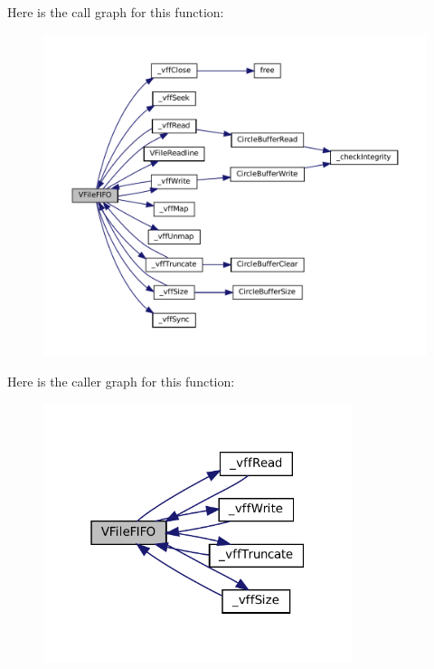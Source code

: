 Here is the call graph for this function\+:
\nopagebreak
\begin{figure}[H]
\begin{center}
\leavevmode
\includegraphics[width=350pt]{vfs-fifo_8c_af4228c6570572950e85b27b5315eec75_cgraph}
\end{center}
\end{figure}
Here is the caller graph for this function\+:
\nopagebreak
\begin{figure}[H]
\begin{center}
\leavevmode
\includegraphics[width=256pt]{vfs-fifo_8c_af4228c6570572950e85b27b5315eec75_icgraph}
\end{center}
\end{figure}
